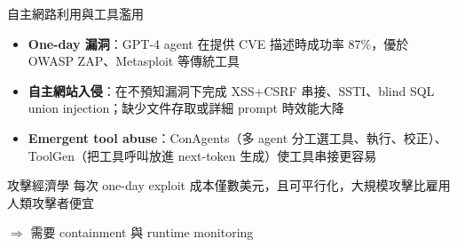 \documentclass[aspectratio=169]{beamer}
\begin{document}
\begin{frame}{自主網路利用與工具濫用}
    \small
    \begin{itemize}
        \item \textbf{One-day 漏洞}：GPT-4 agent 在提供 CVE 描述時成功率 87\%，優於 OWASP ZAP、Metasploit 等傳統工具
        \item \textbf{自主網站入侵}：在不預知漏洞下完成 XSS+CSRF 串接、SSTI、blind SQL union injection；缺少文件存取或詳細 prompt 時效能大降
        \item \textbf{Emergent tool abuse}：ConAgents（多 agent 分工選工具、執行、校正）、ToolGen（把工具呼叫放進 next-token 生成）使工具串接更容易
    \end{itemize}

    \begin{alertblock}{攻擊經濟學}
        每次 one-day exploit 成本僅數美元，且可平行化，大規模攻擊比雇用人類攻擊者便宜
    \end{alertblock}

    $\Rightarrow$ 需要 containment 與 runtime monitoring
\end{frame}
\end{document}
